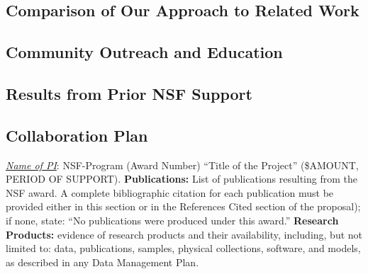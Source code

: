 \subsection{Comparison of Our Approach to Related Work}

\subsection{Community Outreach and Education}

\subsection{Results from Prior NSF Support}

\subsection{Collaboration Plan}

\noindent
\emph{\underline{Name of PI}}: NSF-Program (Award Number) ``Title of the Project'' (\$AMOUNT, PERIOD OF SUPPORT). 
{\bf Publications:} List of publications resulting from the NSF award. A complete bibliographic citation for each
publication must be provided either in this section or in the References Cited section of the proposal); if
none, state: ``No publications were produced under this award.'' {\bf Research Products:} evidence of research products 
and their availability, including, but not limited to: data, publications, samples, physical collections, software, 
and models, as described in any Data Management Plan.
